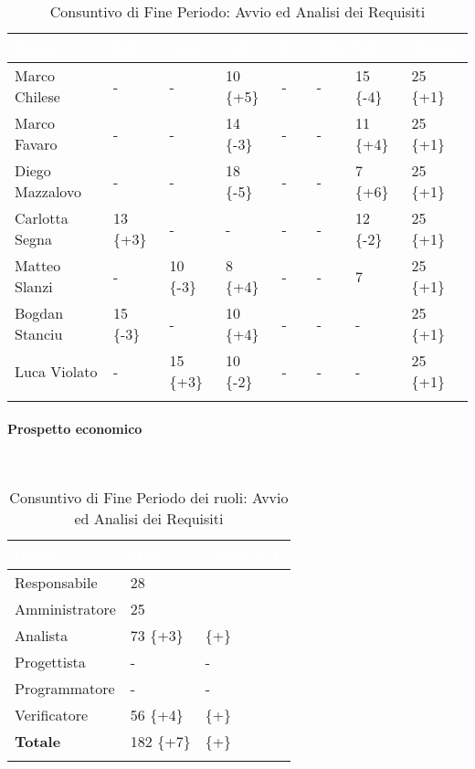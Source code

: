\begin{longtable}{|C{.30\textwidth}|C{.06\textwidth}|C{.06\textwidth}|C{.06\textwidth} | C{.06\textwidth}| C{.06\textwidth} | C{.06\textwidth} | C{.10\textwidth} |}
\hline
{}	\textbf{\textcolor{white}{Nome}} & \textbf{\textcolor{white}{RE}} & \textbf{\textcolor{white}{AM}} & \textbf{\textcolor{white}{AN}} & \textbf{\textcolor{white}{PJ}} & \textbf{\textcolor{white}{PR}} & \textbf{\textcolor{white}{VE}} & \textbf{\textcolor{white}{Totale}}\\
\hline 
Marco Chilese & - & - & 10 \{+5\} & - & - & 15 \{-4\} & 25 \{+1\} \\
\hline
{}Marco Favaro & - & - & 14 \{-3\} & - & - & 11 \{+4\} & 25 \{+1\} \\
\hline
Diego Mazzalovo & - & - & 18 \{-5\} & - & - & 7 \{+6\} & 25 \{+1\} \\
\hline
{}Carlotta Segna & 13 \{+3\} & - & - & - & - & 12 \{-2\} & 25 \{+1\} \\
\hline
Matteo Slanzi & - & 10 \{-3\} & 8 \{+4\} & - & - & 7 & 25 \{+1\} \\
\hline
{}Bogdan Stanciu & 15 \{-3\} & - & 10 \{+4\} & - & - & - & 25 \{+1\}\\
\hline
Luca Violato & - & 15 \{+3\} & 10 \{-2\} & - & - & - & 25 \{+1\} \\
\hline


\caption{Consuntivo di Fine Periodo: Avvio ed Analisi dei Requisiti}
\label{tab:cfp_aar}
\end{longtable}

\paragraph{Prospetto economico} \-\\

\begin{longtable}{| C{.30\textwidth}| C{.15\textwidth}| C{.20\textwidth}|}
\hline
{}\textbf{\textcolor{white}{Ruolo}} & \textbf{\textcolor{white}{Ore}} & \textbf{\textcolor{white}{Costo in \euro}} \\
\hline
Responsabile & 28 &  \\
\hline
{}Amministratore & 25 &  \\
\hline
Analista & 73 \{+3\} &  \{+\}\\
\hline
{}Progettista & - & - \\
\hline
Programmatore & - & - \\
\hline
{}Verificatore & 56 \{+4\} &  \{+\}\\
\hline
\textbf{Totale} & 182 \{+7\}&  \{+\}\\
\hline
\caption{Consuntivo di Fine Periodo dei ruoli: Avvio ed Analisi dei Requisiti}
\label{tab:doaar}
\end{longtable}

